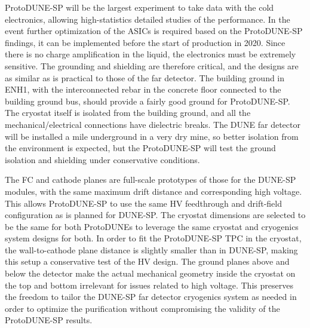 ProtoDUNE-SP will be the largest experiment to take data with the cold electronics, allowing high-statistics detailed studies of the performance. In the event further optimization of the ASICs is required based on the ProtoDUNE-SP findings, it can be implemented before the start of production in 2020. Since %
there is no charge amplification in the liquid, the electronics must be extremely sensitive. The grounding and shielding are therefore critical, and the designs are as similar as is practical to those of the far detector. The building ground in ENH1, with the interconnected rebar in the concrete floor 
connected to the building ground bus, should provide a fairly good ground for ProtoDUNE-SP. The cryostat itself is isolated from the building ground, and all the mechanical/electrical connections have dielectric breaks. The DUNE far detector will be installed a mile underground in a very dry mine, so better isolation from the environment is expected, but the ProtoDUNE-SP will test the ground isolation and shielding under conservative conditions.


The FC and cathode planes are full-scale prototypes of those for the DUNE-SP modules, 
with the same maximum drift distance and corresponding high voltage.
This allows ProtoDUNE-SP to use the same HV feedthrough and drift-field configuration as is planned for DUNE-SP. The cryostat dimensions are selected to be the same for both ProtoDUNEs %
to leverage the same cryostat and cryogenics system designs for both. 
In order to fit the ProtoDUNE-SP TPC in the cryostat, the wall-to-cathode plane distance is slightly smaller than in DUNE-SP, making this setup a conservative test of the HV design. The ground planes above and below 
the detector 
make the actual mechanical geometry inside the 
cryostat on the top and bottom irrelevant for issues related to high voltage. This preserves the freedom to tailor the DUNE-SP far detector cryogenics system as needed in order to optimize the purification without compromising the validity of the ProtoDUNE-SP results. %

